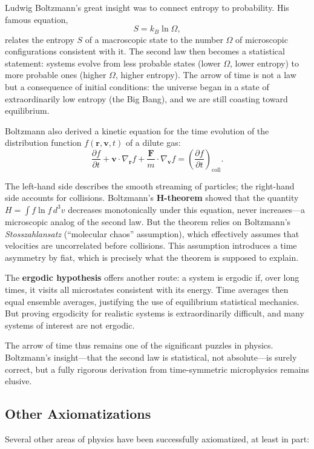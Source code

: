 Ludwig Boltzmann's great insight was to connect entropy to probability. His famous equation,
\[
S = k_B \ln \Omega,
\]
relates the entropy $S$ of a macroscopic state to the number $\Omega$ of microscopic configurations consistent with it. The second law then becomes a statistical statement: systems evolve from less probable states (lower $\Omega$, lower entropy) to more probable ones (higher $\Omega$, higher entropy). The arrow of time is not a law but a consequence of initial conditions: the universe began in a state of extraordinarily low entropy (the Big Bang), and we are still coasting toward equilibrium.

Boltzmann also derived a kinetic equation for the time evolution of the distribution function $f(\mathbf{r}, \mathbf{v}, t)$ of a dilute gas:
\[
\frac{\partial f}{\partial t} + \mathbf{v} \cdot \nabla_{\mathbf{r}} f + \frac{\mathbf{F}}{m} \cdot \nabla_{\mathbf{v}} f = \left( \frac{\partial f}{\partial t} \right)_{\text{coll}}.
\]

The left-hand side describes the smooth streaming of particles; the right-hand side accounts for collisions. Boltzmann's \textbf{H-theorem} showed that the quantity $H = \int f \ln f \, d^3v$ decreases monotonically under this equation, never increases---a microscopic analog of the second law. But the theorem relies on Boltzmann's \emph{Stosszahlansatz} (``molecular chaos'' assumption), which effectively assumes that velocities are uncorrelated before collisions. This assumption introduces a time asymmetry by fiat, which is precisely what the theorem is supposed to explain.

The \textbf{ergodic hypothesis} offers another route: a system is ergodic if, over long times, it visits all microstates consistent with its energy. Time averages then equal ensemble averages, justifying the use of equilibrium statistical mechanics. But proving ergodicity for realistic systems is extraordinarily difficult, and many systems of interest are not ergodic.

The arrow of time thus remains one of the significant puzzles in physics. Boltzmann's insight---that the second law is statistical, not absolute---is surely correct, but a fully rigorous derivation from time-symmetric microphysics remains elusive.

\subsection{Other Axiomatizations}

Several other areas of physics have been successfully axiomatized, at least in part:

